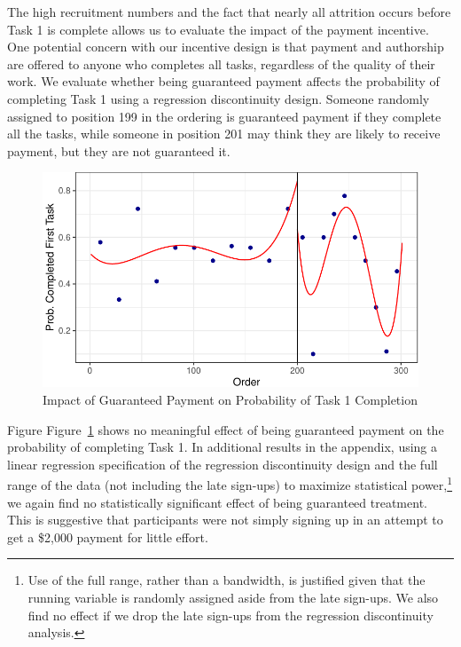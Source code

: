 \documentclass[
  letterpaper,
  DIV=11,
  numbers=noendperiod]{scrartcl}
\begin{document}
The high recruitment numbers and the fact that nearly all attrition
occurs before Task 1 is complete allows us to evaluate the impact of the
payment incentive. One potential concern with our incentive design is
that payment and authorship are offered to anyone who completes all
tasks, regardless of the quality of their work. We evaluate whether
being guaranteed payment affects the probability of completing Task 1
using a regression discontinuity design. Someone randomly assigned to
position 199 in the ordering is guaranteed payment if they complete all
the tasks, while someone in position 201 may think they are likely to
receive payment, but they are not guaranteed it.

\begin{figure}

{\centering \includegraphics{The-Sources-of-Researcher-Variation-in-Economics_files/figure-pdf/fig-rdd-1.pdf}

}

\caption{\label{fig-rdd}Impact of Guaranteed Payment on Probability of
Task 1 Completion}

\end{figure}

Figure Figure~\ref{fig-rdd} shows no meaningful effect of being
guaranteed payment on the probability of completing Task 1. In
additional results in the appendix, using a linear regression
specification of the regression discontinuity design and the full range
of the data (not including the late sign-ups) to maximize statistical
power,\footnote{Use of the full range, rather than a bandwidth, is
  justified given that the running variable is randomly assigned aside
  from the late sign-ups. We also find no effect if we drop the late
  sign-ups from the regression discontinuity analysis.} we again find no
statistically significant effect of being guaranteed treatment. This is
suggestive that participants were not simply signing up in an attempt to
get a \$2,000 payment for little effort.
\end{document}
